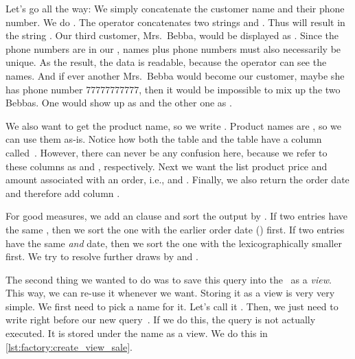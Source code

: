 Let's go all the way:
We simply concatenate the customer name and their phone number.
We do .
The \sqlIdx{\textbar\textbar} operator concatenates two strings  and .
Thus  will result in the string .
Our third customer, Mrs.~Bebba, would be displayed as .
Since the phone numbers are  in our \db, names plus phone numbers must also necessarily be unique.
As the result, the data is readable, because the operator can see the names.
And if ever another Mrs.~Bebba would become our customer, maybe she has phone number 77777777777, then it would be impossible to mix up the two Bebbas.
One would show up as  and the other one as .

We also want to get the product name, so we write .
Product names are , so we can use them as-is.
Notice how both the table  and the table  have a column called~.
However, there can never be any confusion here, because we refer to these columns as  and , respectively.
Next we want the list product price and amount associated with an order, i.e.,  and .
Finally, we also return the order date and therefore add column .

For good measures, we add an  clause and sort the output by .
If two entries have the same , then we sort the one with the earlier order date () first.
If two entries have the same  \emph{and}  date, then we sort the one with the lexicographically smaller  first.
We try to resolve further draws by  and .

The second thing we wanted to do was to save this query into the \db\ as a \emph{view}.
This way, we can re-use it whenever we want.
Storing it as a view is very very simple.
We first need to pick a name for it.
Let's call it .
Then, we just need to write  right before our new query~\cite{PGDG:PD:CV}.
If we do this, the query is not actually executed.
It is stored under the name  as a view.
We do this in \cref{lst:factory:create_view_sale}.

